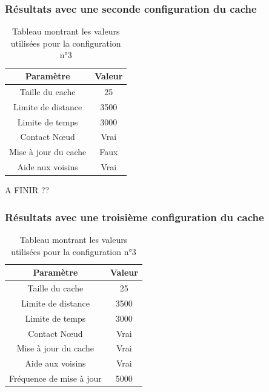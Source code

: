 \newpage
\subsubsection{Résultats avec une seconde configuration du cache}

\begin{table}[!h]
  \begin{center}
    \begin{tabular}{|c|c|}
      \hline
      Paramètre & Valeur\\
      \hline
      Taille du cache & 25\\
      Limite de distance &  3500\\
      Limite de temps & 3000\\
      Contact Nœud & Vrai\\
      Mise à jour du cache & Faux\\
      Aide aux voisins & Vrai\\
      \hline
    \end{tabular}
  \end{center}
  \label{tab:config2}
  \caption{Tableau montrant les valeurs utilisées pour la configuration n°3}
\end{table}



A FINIR ??


\subsubsection{Résultats avec une troisième configuration du cache}

\begin{table}[!h]
  \begin{center}
    \begin{tabular}{|c|c|}
      \hline
      Paramètre & Valeur\\
      \hline
      Taille du cache & 25\\
      Limite de distance &  3500\\
      Limite de temps & 3000\\
      Contact Nœud & Vrai\\
      Mise à jour du cache & Vrai\\
      Aide aux voisins & Vrai\\
      Fréquence de mise à jour & 5000\\
      \hline
    \end{tabular}
  \end{center}
  \label{tab:config3}
  \caption{Tableau montrant les valeurs utilisées pour la configuration n°3}
\end{table}


